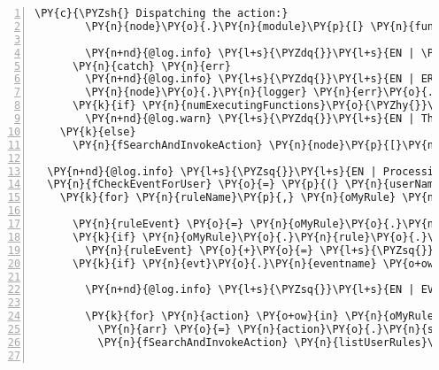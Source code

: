 \begin{Verbatim}[fontsize=\scriptsize,commandchars=\\\{\},numbers=left,firstnumber=1,stepnumber=1]
        \PY{c}{\PYZsh{} Dispatching the action:}
        \PY{n}{node}\PY{o}{.}\PY{n}{module}\PY{p}{[} \PY{n}{funcName} \PY{p}{]}\PY{o}{.}\PY{n}{apply} \PY{n}{this}\PY{p}{,} \PY{n}{arrArgs}

        \PY{n+nd}{@log.info} \PY{l+s}{\PYZdq{}}\PY{l+s}{EN | \PYZsh{}\PYZob{} funcName \PYZcb{} finished execution}\PY{l+s}{\PYZdq{}}
      \PY{n}{catch} \PY{n}{err}
        \PY{n+nd}{@log.info} \PY{l+s}{\PYZdq{}}\PY{l+s}{EN | ERROR IN ACTION INVOKER: }\PY{l+s}{\PYZdq{}} \PY{o}{+} \PY{n}{err}\PY{o}{.}\PY{n}{message}
        \PY{n}{node}\PY{o}{.}\PY{n}{logger} \PY{n}{err}\PY{o}{.}\PY{n}{message}
      \PY{k}{if} \PY{n}{numExecutingFunctions}\PY{o}{\PYZhy{}}\PY{o}{\PYZhy{}} \PY{o}{\PYZpc{}} \PY{l+m+mi}{100} \PY{o+ow}{is} \PY{l+m+mi}{0}
        \PY{n+nd}{@log.warn} \PY{l+s}{\PYZdq{}}\PY{l+s}{EN | The system is producing too many tokens! Currently: \PYZsh{}\PYZob{} numExecutingFunctions \PYZcb{}}\PY{l+s}{\PYZdq{}}
    \PY{k}{else}
      \PY{n}{fSearchAndInvokeAction} \PY{n}{node}\PY{p}{[}\PY{n}{arrPath}\PY{p}{[}\PY{n}{depth}\PY{p}{]}\PY{p}{]}\PY{p}{,} \PY{n}{arrPath}\PY{p}{,} \PY{n}{funcName}\PY{p}{,} \PY{n}{evt}\PY{p}{,} \PY{n}{depth} \PY{o}{+} \PY{l+m+mi}{1}

  \PY{n+nd}{@log.info} \PY{l+s}{\PYZsq{}}\PY{l+s}{EN | Processing event: }\PY{l+s}{\PYZsq{}} \PY{o}{+} \PY{n}{evt}\PY{o}{.}\PY{n}{eventname}
  \PY{n}{fCheckEventForUser} \PY{o}{=} \PY{p}{(} \PY{n}{userName}\PY{p}{,} \PY{n}{oUser} \PY{p}{)} \PY{o}{=}\PY{o}{\PYZgt{}}
    \PY{k}{for} \PY{n}{ruleName}\PY{p}{,} \PY{n}{oMyRule} \PY{n}{of} \PY{n}{oUser}

      \PY{n}{ruleEvent} \PY{o}{=} \PY{n}{oMyRule}\PY{o}{.}\PY{n}{rule}\PY{o}{.}\PY{n}{eventname}
      \PY{k}{if} \PY{n}{oMyRule}\PY{o}{.}\PY{n}{rule}\PY{o}{.}\PY{n}{timestamp}
        \PY{n}{ruleEvent} \PY{o}{+}\PY{o}{=} \PY{l+s}{\PYZsq{}}\PY{l+s}{\PYZus{}created:}\PY{l+s}{\PYZsq{}} \PY{o}{+} \PY{n}{oMyRule}\PY{o}{.}\PY{n}{rule}\PY{o}{.}\PY{n}{timestamp}
      \PY{k}{if} \PY{n}{evt}\PY{o}{.}\PY{n}{eventname} \PY{o+ow}{is} \PY{n}{ruleEvent} \PY{o+ow}{and} \PY{n}{validConditions} \PY{n}{evt}\PY{p}{,} \PY{n}{oMyRule}\PY{o}{.}\PY{n}{rule}\PY{p}{,} \PY{n}{userName}\PY{p}{,} \PY{n}{ruleName}
        
        \PY{n+nd}{@log.info} \PY{l+s}{\PYZsq{}}\PY{l+s}{EN | EVENT FIRED: }\PY{l+s}{\PYZsq{}} \PY{o}{+} \PY{n}{evt}\PY{o}{.}\PY{n}{eventname} \PY{o}{+} \PY{l+s}{\PYZsq{}}\PY{l+s}{ for rule }\PY{l+s}{\PYZsq{}} \PY{o}{+} \PY{n}{ruleName}
        
        \PY{k}{for} \PY{n}{action} \PY{o+ow}{in} \PY{n}{oMyRule}\PY{o}{.}\PY{n}{rule}\PY{o}{.}\PY{n}{actions}
          \PY{n}{arr} \PY{o}{=} \PY{n}{action}\PY{o}{.}\PY{n}{split} \PY{l+s}{\PYZsq{}}\PY{l+s}{ \PYZhy{}\PYZgt{} }\PY{l+s}{\PYZsq{}}
          \PY{n}{fSearchAndInvokeAction} \PY{n}{listUserRules}\PY{p}{,} \PY{p}{[} \PY{n}{userName}\PY{p}{,} \PY{n}{ruleName}\PY{p}{,} \PY{l+s}{\PYZsq{}}\PY{l+s}{actions}\PY{l+s}{\PYZsq{}}\PY{p}{,} \PY{n}{arr}\PY{p}{[}\PY{l+m+mi}{0}\PY{p}{]}\PY{p}{]}\PY{p}{,} \PY{n}{arr}\PY{p}{[}\PY{l+m+mi}{1}\PY{p}{]}\PY{p}{,} \PY{n}{evt}\PY{p}{,} \PY{l+m+mi}{0}


\end{Verbatim}
